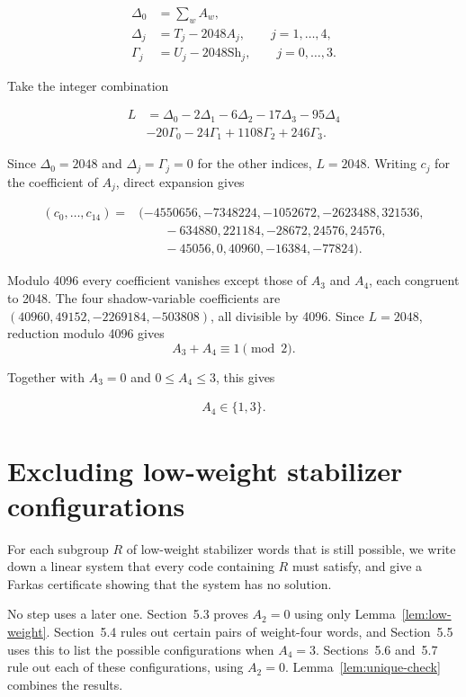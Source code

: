 \documentclass[11pt]{article}
\newcommand{\Sh}{\mathrm{Sh}}
\begin{document}
\[
\begin{aligned}
\Delta_{0} &=\sum_{w} A_{w}, \\
\Delta_{j} &=T_{j} -2048 A_{j},\qquad j=1,\dots,4, \\
\Gamma_{j} &=U_{j} -2048 \Sh_{j},\qquad j=0,\dots,3.
\end{aligned}
\]

Take the integer combination

\[
\begin{aligned}
L &=\Delta_{0} -2\Delta_{1} -6\Delta_{2} -17\Delta_{3} -95\Delta_{4} \\
& -20\Gamma_{0} -24\Gamma_{1} +1108\Gamma_{2} +246\Gamma_{3}.
\end{aligned}
\]

Since \(\Delta_0=2048\) and \(\Delta_j=\Gamma_j=0\) for the other indices, \(L=2048\). Writing \(c_j\) for the coefficient of \(A_j\), direct expansion gives

\[
\begin{aligned}
(c_0,\dots,c_{14})={}&(-4550656,-7348224,-1052672,-2623488,321536,\\
&\qquad -634880,221184,-28672,24576,24576,\\
&\qquad -45056,0,40960,-16384,-77824).
\end{aligned}
\]

Modulo 4096 every coefficient vanishes except those of \(A_{3}\) and \(A_{4}\), each congruent to 2048. The four shadow-variable coefficients are \((40960, 49152, -2269184, -503808)\), all divisible by 4096. Since \(L=2048\), reduction modulo 4096 gives
\[
A_{3}+A_{4}\equiv1\pmod 2.
\]

Together with \(A_{3}=0\) and \(0 \leq A_{4} \leq 3\), this gives

\[
\begin{aligned}
A_{4} \in \{1,3\}.
\end{aligned}
\]

\section{Excluding low-weight stabilizer configurations}\label{excluding-low-weight-stabilizer-configurations}

For each subgroup \(R\) of low-weight stabilizer words that is still possible, we write down a linear system that every code containing \(R\) must satisfy, and give a Farkas certificate showing that the system has no solution.

No step uses a later one. Section~5.3 proves \(A_2=0\) using only Lemma~\ref{lem:low-weight}. Section~5.4 rules out certain pairs of weight-four words, and Section~5.5 uses this to list the possible configurations when \(A_4=3\). Sections~5.6 and~5.7 rule out each of these configurations, using \(A_2=0\). Lemma~\ref{lem:unique-check} combines the results.
\end{document}
